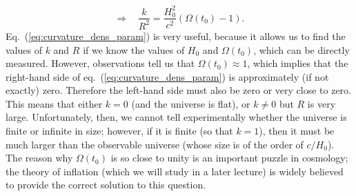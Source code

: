 \documentclass[11pt, a4paper,oneside,openright]{book}
\numberwithin{equation}{section}
\begin{document}
\begin{equation} \label{eq:curvature_dens_param}
\Rightarrow~~~~\frac{k}{R^2}=\frac{H_0^2}{c^2}\left(\Omega(t_0)-1\right).
\end{equation}
Eq.\ (\ref{eq:curvature_dens_param}) is very useful, because it allows us to find the values of $k$ and $R$ if we know the values of $H_0$ and $\Omega(t_0)$, which can be directly measured. However, observations tell us that $\Omega(t_0)\approx1$, which implies that the right-hand side of eq.\ (\ref{eq:curvature_dens_param}) is approximately (if not exactly) zero. Therefore the left-hand side must also be zero or very close to zero. This means that either $k=0$ (and the universe is flat), or $k\neq0$ but $R$ is very large. Unfortunately, then, we cannot tell experimentally whether the universe is finite or infinite in size; however, if it is finite (so that $k=1$), then it must be much larger than the observable universe (whose size is of the order of $c/H_0$). The reason why $\Omega(t_0)$ is so close to unity is an important puzzle in cosmology; the theory of inflation (which we will study in a later lecture) is widely believed to provide the correct solution to this question.
\end{document}
